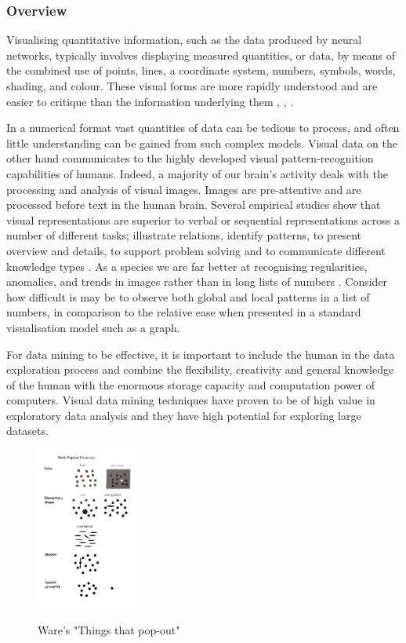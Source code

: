 \documentclass[a4paper,11pt,titlepage]{article}
\begin{document}
	\subsubsection{Overview}
		Visualising quantitative information, such as the data produced by neural networks, typically involves displaying measured quantities, or data, by means of the combined use of points, lines, a coordinate system, numbers, symbols, words, shading, and colour. These visual forms are more rapidly understood and are easier to critique than the information underlying them \cite{DeFanti1989}, \cite{McCormick1987}, \cite{Tufte2001}.
		\par
		In a numerical format vast quantities of data can be tedious to process, and often little understanding can be gained from such complex models. Visual data on the other hand communicates to the highly developed visual pattern-recognition capabilities of humans. Indeed, a majority of our brain's activity deals with the processing and analysis of visual images. Images are pre-attentive and are processed before text in the human brain. Several empirical studies show that visual representations are superior to verbal or sequential representations across a number of different tasks; illustrate relations, identify patterns, to present overview and details, to support problem solving and to communicate different knowledge types \cite{Burkhard2004}. As a species we are far better at recognising regularities, anomalies, and trends in images rather than in long lists of numbers \cite{Ware2010}. Consider how difficult is may be to observe both global and local patterns in a list of numbers, in comparison to the relative ease when presented in a standard visualisation model such as a graph.
		\par 
		For data mining to be effective, it is important to include the human in the data exploration process and combine the flexibility, creativity and general knowledge of the human with the enormous storage capacity and computation power of computers. Visual data mining techniques have proven to be of high value in exploratory data analysis and they have high potential for exploring large datasets.
			  		 
  		\begin{figure}[H]
    			\centering	
			{{\includegraphics[width=0.3\textwidth]
    				{img/ware_popout_channels.png} 
    			}}%
    			\caption{Ware's "Things that pop-out"}%
    		\label{fig:Ware Pop-Out}
		\end{figure}
		
\end{document}
